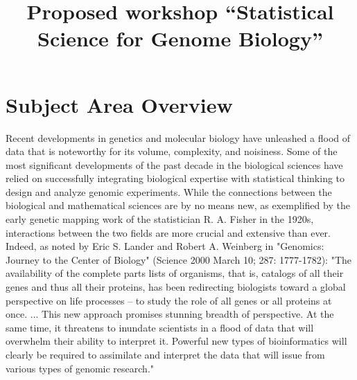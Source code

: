 \documentclass{amsart}
\begin{document}
\title{Proposed workshop ``Statistical Science for Genome Biology''}

\maketitle

\section*{Subject Area Overview}

Recent developments in genetics and molecular biology have unleashed a
flood of data that is noteworthy for its volume, complexity, and
noisiness. Some of the most significant developments of the past
decade in the biological sciences have relied on successfully
integrating biological expertise with statistical thinking to design
and analyze genomic experiments. While the connections between the
biological and mathematical sciences are by no means new, as
exemplified by the early genetic mapping work of the statistician
R. A. Fisher in the 1920s, interactions between the two fields are
more crucial and extensive than ever.  Indeed, as noted by Eric
S. Lander and Robert A. Weinberg in "Genomics: Journey to the Center
of Biology" (Science 2000 March 10; 287: 1777-1782): "The availability
of the complete parts lists of organisms, that is, catalogs of all
their genes and thus all their proteins, has been redirecting
biologists toward a global perspective on life processes -- to study
the role of all genes or all proteins at once. ... This new approach
promises stunning breadth of perspective. At the same time, it
threatens to inundate scientists in a flood of data that will
overwhelm their ability to interpret it. Powerful new types of
bioinformatics will clearly be required to assimilate and interpret
the data that will issue from various types of genomic research."
\end{document}

